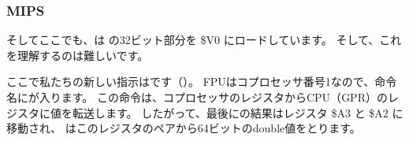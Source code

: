 ﻿\subsubsection{MIPS}



そしてここでも、は \Tdouble の32ビット部分を \$V0 にロードしています。 
そして、これを理解するのは難しいです。


ここで私たちの新しい指示はです（）。 
FPUはコプロセッサ番号1なので、命令名にが入ります。 
この命令は、コプロセッサのレジスタからCPU（\ac{GPR}）のレジスタに値を転送します。 
したがって、最後にの結果はレジスタ \$A3 と \$A2 に移動され、
\printf はこのレジスタのペアから64ビットのdouble値をとります。
